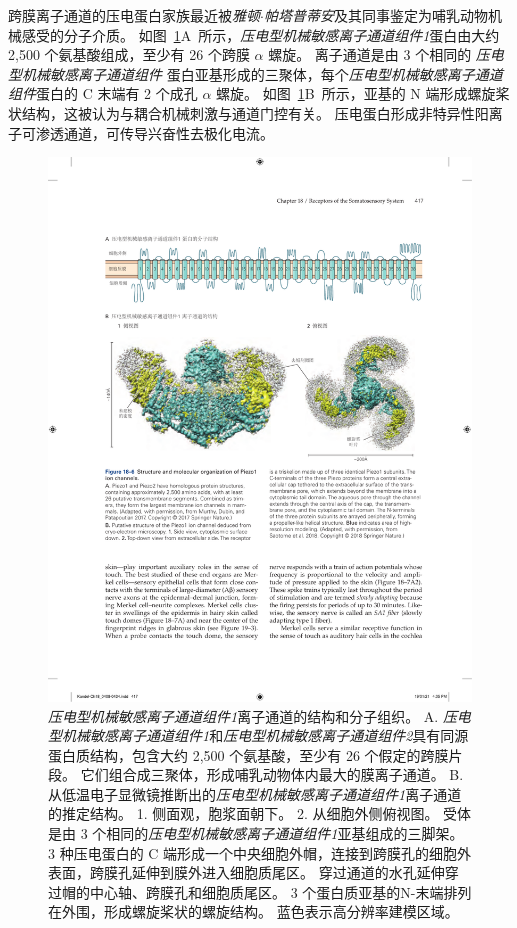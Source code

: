 跨膜离子通道的压电蛋白家族最近被\textit{雅顿$\cdot$帕塔普蒂安}及其同事鉴定为哺乳动物机械感受的分子介质。
如图~\ref{fig:18_6}A~所示，\textit{压电型机械敏感离子通道组件1}蛋白由大约 2,500 个氨基酸组成，至少有 26 个跨膜 $\alpha$ 螺旋。
离子通道是由 3 个相同的 \textit{压电型机械敏感离子通道组件} 蛋白亚基形成的三聚体，每个\textit{压电型机械敏感离子通道组件}蛋白的 C 末端有 2 个成孔 $\alpha$ 螺旋。
如图~\ref{fig:18_6}B~所示，亚基的 N 端形成螺旋桨状结构，这被认为与耦合机械刺激与通道门控有关。
压电蛋白形成非特异性阳离子可渗透通道，可传导兴奋性去极化电流。


\begin{figure}[htbp]
	\centering
	\includegraphics[width=1.0\linewidth]{chap18/fig_18_6}
	\caption{\textit{压电型机械敏感离子通道组件1}离子通道的结构和分子组织。
		A. \textit{压电型机械敏感离子通道组件1}和\textit{压电型机械敏感离子通道组件2}具有同源蛋白质结构，包含大约 2,500 个氨基酸，至少有 26 个假定的跨膜片段。
		它们组合成三聚体，形成哺乳动物体内最大的膜离子通道\cite{murthy2017piezos}。
		B. 从低温电子显微镜推断出的\textit{压电型机械敏感离子通道组件1}离子通道的推定结构。
		1. 侧面观，胞浆面朝下。
		2. 从细胞外侧俯视图。
		受体是由 3 个相同的\textit{压电型机械敏感离子通道组件1}亚基组成的三脚架。
		3 种压电蛋白的 C 端形成一个中央细胞外帽，连接到跨膜孔的细胞外表面，跨膜孔延伸到膜外进入细胞质尾区。
		穿过通道的水孔延伸穿过帽的中心轴、跨膜孔和细胞质尾区。
		3 个蛋白质亚基的N-末端排列在外围，形成螺旋桨状的螺旋结构。
		蓝色表示高分辨率建模区域\cite{saotome2018structure}。}
	\label{fig:18_6}
\end{figure}



